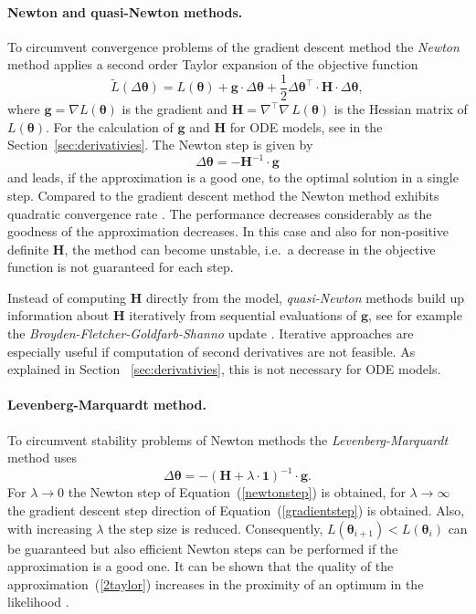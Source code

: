 \documentclass[12pt,a4paper]{scrartcl}
\begin{document}
\paragraph{Newton and quasi-Newton methods.}
To circumvent convergence problems of the gradient descent method the \emph{Newton} method applies a 
second order Taylor expansion of the objective function
\begin{equation}
	\tilde L(\Delta \boldsymbol{\theta}) = L(\boldsymbol{\theta}) + \mathbf{g} \cdot \Delta 
\boldsymbol{\theta} + \frac{1}{2} \Delta \boldsymbol{\theta}^\top \cdot \mathbf{H} \cdot \Delta 
\boldsymbol{\theta}, \label{2taylor}
\end{equation}
where $\mathbf{g} = \nabla L(\boldsymbol{\theta})$ is the gradient and $\mathbf{H} = \nabla^\top\nabla\, 
L(\boldsymbol{\theta})$ is the Hessian matrix of $L(\boldsymbol{\theta})$. For the calculation of $\mathbf{g}
$ and $\mathbf{H}$ for ODE models, see in the Section~\ref{sec:derivativies}. The Newton step is given by 
\begin{equation}
	\Delta \boldsymbol{\theta} = -\mathbf{H}^{-1} \cdot \mathbf{g} \label{newtonstep}
\end{equation}
and leads, if the approximation is a good one, to the optimal solution in a single step. Compared to the 
gradient descent method the Newton method exhibits quadratic convergence rate \citep{Stoer:2005fk}. The 
performance decreases considerably as the goodness of the approximation decreases. In this case and 
also for non-positive definite $\mathbf{H}$, the method can become unstable, i.e.~a decrease in the 
objective function is not guaranteed for each step. 

Instead of computing $\mathbf{H}$ directly from the model, \emph{quasi-Newton} methods build up 
information about $\mathbf{H}$ iteratively from sequential evaluations of $\mathbf{g}$, see for example the 
\emph{Broyden-Fletcher-Goldfarb-Shanno} update \citep{Shanno:1970fk}. Iterative approaches are 
especially useful if computation of second derivatives are not feasible. As explained in Section~
\ref{sec:derivativies}, this is not necessary for ODE models.

\paragraph{Levenberg-Marquardt method.}
To circumvent stability problems of Newton methods the \emph{Levenberg-Marquardt} method 
\citep{Marquardt:1963uq} uses 
\begin{equation}
	\Delta \boldsymbol{\theta} = -(\mathbf{H} + \lambda \cdot \mathbf{1})^{-1} \cdot 	\mathbf{g}. 
\end{equation}	
For $\lambda \rightarrow 0$ the Newton step of Equation~(\ref{newtonstep}) is obtained, for $\lambda 
\rightarrow \infty$ the gradient descent step direction of Equation~(\ref{gradientstep}) is obtained. Also, with 
increasing $\lambda$ the step size is reduced. Consequently, $L(\boldsymbol{\theta}_{i+1}) < 
L(\boldsymbol{\theta}_{i})$ can be guaranteed but also efficient Newton steps can be performed if the 
approximation is a good one. It can be shown that the quality of the approximation~(\ref{2taylor}) increases 
in the proximity of an optimum in the likelihood \citep{Seber:2003kq}.
\end{document}
